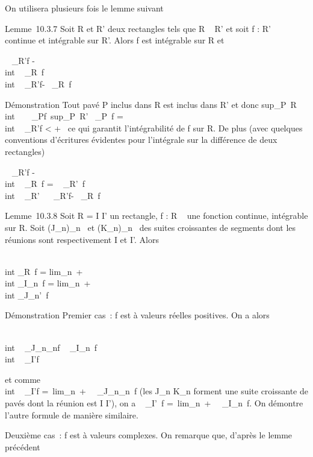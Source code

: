 \documentclass[]{article}
\begin{document}
On utilisera plusieurs fois le lemme suivant

Lemme~10.3.7 Soit R et R' deux rectangles tels que R \subset~ R' et soit f : R'
\rightarrow~  continue et intégrable sur R'. Alors f est intégrable sur R et

\left \int ~
\int  _R'f -\\int ~
\int  _R~f\right
\leq\int  \\int ~
_R'f-\int ~
\int  _R~f

Démonstration Tout pavé P inclus dans R est inclus dans R' et donc
sup_P\subset~R\\int ~
\int ~
_Pf\leq\
sup_P\subset~R'\int ~
\int  _P~f
=\int  \\int ~
_R'f < +\infty~ ce qui garantit
l'intégrabilité de f sur R. De plus (avec quelques conventions
d'écritures évidentes pour l'intégrale sur la différence de deux
rectangles)

\left \int ~
\int  _R'f -\\int ~
\int  _R~f\right
 = \left \int ~
\int  _R'\diagdownR~f\right
\leq\int  \\int ~
_R'\diagdownRf\leq\int ~
\int ~
_R'f-\int ~
\int  _R~f

Lemme~10.3.8 Soit R = I \times I' un rectangle, f : R \rightarrow~  une fonction
continue, intégrable sur R. Soit (J_n)_n\in{}~ et
(K_n)_n\in\mathbb{N}~ des suites croissantes de segments dont les
réunions sont respectivement I et I'. Alors

\int  \\int  _R~f
= lim_n\rightarrow~+\infty~~\\int
 \int  _I\timesK_n~f
= lim_n\rightarrow~+\infty~~\\int
 \int  _J_n\timesI'~f

Démonstration Premier cas~: f est à valeurs réelles positives. On a
alors

\int  \\int ~
_J_n\timesK_nf \leq\int ~
\int  _I\timesK_n~f
\leq\int  \\int ~
_I\timesI'f

et comme \int  \\int ~
_I\timesI'f =\
lim_n\rightarrow~+\infty~\int ~
\int  _J_n\timesK_n~f (les
J_n _n forment une suite croissante de pavés dont
la réunion est I \times I'), on a \int ~
\int  _I\timesI'~f =\
lim_n\rightarrow~+\infty~\int ~
\int  _I\timesK_n~f. On démontre
l'autre formule de manière similaire.

Deuxième cas~: f est à valeurs complexes. On remarque que, d'après le
lemme précédent
\end{document}
